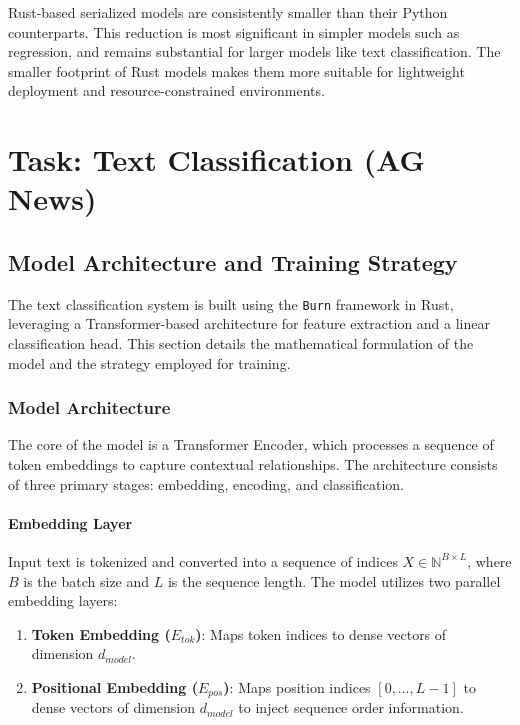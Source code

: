 \documentclass{ieeeaccess}
\begin{document}
\noindent
Rust-based serialized models are consistently smaller than their Python counterparts. This reduction is most significant in simpler models such as regression, and remains substantial for larger models like text classification. The smaller footprint of Rust models makes them more suitable for lightweight deployment and resource-constrained environments.

\clearpage

\section{Task: Text Classification (AG News)}
\subsection{Model Architecture and Training Strategy}

The text classification system is built using the \texttt{Burn} framework in Rust, leveraging a Transformer-based architecture for feature extraction and a linear classification head. This section details the mathematical formulation of the model and the strategy employed for training.

\subsubsection{Model Architecture}
The core of the model is a Transformer Encoder, which processes a sequence of token embeddings to capture contextual relationships. The architecture consists of three primary stages: embedding, encoding, and classification.

\paragraph{Embedding Layer}
Input text is tokenized and converted into a sequence of indices $X \in \mathbb{N}^{B \times L}$, where $B$ is the batch size and $L$ is the sequence length. The model utilizes two parallel embedding layers:
\begin{enumerate}
    \item \textbf{Token Embedding ($E_{tok}$)}: Maps token indices to dense vectors of dimension $d_{model}$.
    \item \textbf{Positional Embedding ($E_{pos}$)}: Maps position indices $[0, \dots, L-1]$ to dense vectors of dimension $d_{model}$ to inject sequence order information.
\end{enumerate}
\end{document}

